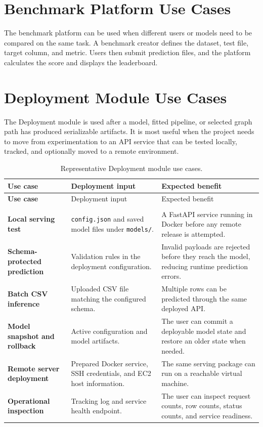 \documentclass[12pt,a4paper]{report}
\newcommand{\acceleraTableStyle}{%
\small
\renewcommand{\arraystretch}{1.15}
\setlength{\tabcolsep}{4pt}%
}
\newcommand{\modulepath}[1]{\texttt{#1}}
\begin{document}
\section{Benchmark Platform Use Cases}
The benchmark platform can be used when different users or models need to be
compared on the same task. A benchmark creator defines the dataset, test file,
target column, and metric. Users then submit prediction files, and the platform
calculates the score and displays the leaderboard.

\section{Deployment Module Use Cases}
The Deployment module is used after a model, fitted pipeline, or selected graph
path has produced serializable artifacts. It is most useful when the project
needs to move from experimentation to an API service that can be tested locally,
tracked, and optionally moved to a remote environment.

{\acceleraTableStyle
\renewcommand{\arraystretch}{1.02}
\setlength{\tabcolsep}{3pt}
\begin{longtable}{>{\bfseries}p{} p{} p{}}
\caption{Representative Deployment module use cases.}
\label{tab:deployment-use-cases} \\
\toprule
Use case & Deployment input & Expected benefit \\
\midrule
\endfirsthead
\toprule
Use case & Deployment input & Expected benefit \\
\midrule
\endhead
\midrule
\multicolumn{3}{r}{\small Continued on the next page} \\
\endfoot
\bottomrule
\endlastfoot
Local serving test & \modulepath{config.json} and saved model files under
\modulepath{models/}. & A FastAPI service running in Docker before any remote
release is attempted. \\
\addlinespace
Schema-protected prediction & Validation rules in the deployment
configuration. & Invalid payloads are rejected before they reach the model,
reducing runtime prediction errors. \\
\addlinespace
Batch CSV inference & Uploaded CSV file matching the configured schema. &
Multiple rows can be predicted through the same deployed API. \\
\addlinespace
Model snapshot and rollback & Active configuration and model artifacts. &
The user can commit a deployable model state and restore an older state when
needed. \\
\addlinespace
Remote server deployment & Prepared Docker service, SSH credentials, and EC2
host information. & The same serving package can run on a reachable virtual
machine. \\
\addlinespace
Operational inspection & Tracking log and service health endpoint. & The user
can inspect request counts, row counts, status counts, and service readiness. \\
\end{longtable}
}
\end{document}
